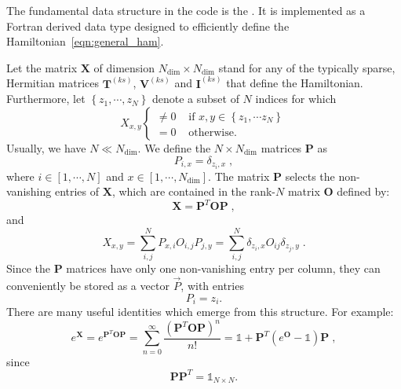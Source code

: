 The fundamental data structure in the code is the . It is implemented as a Fortran derived data type designed to efficiently define the Hamiltonian~\eqref{eqn:general_ham}.

Let the matrix $\bm{X}$ of dimension $N_{\mathrm{dim}} \times N_{\mathrm{dim}}$ stand for any of the typically sparse, Hermitian matrices $\bm{T}^{(ks)}$, $\bm{V}^{(ks)}$ and $\bm{I}^{(ks)}$ that define the Hamiltonian.
Furthermore, let $\left\{z_{1},\cdots, z_{N} \right\}$ denote a subset of $N$ indices
for which
\begin{equation}
X_{x,y} 
\left\{\begin{matrix}  \neq 0  &  \text{ if }   x,  y  \in \left\{ z_1, \cdots z_N \right\}\\ 
                                 = 0         &  \text{ otherwise. } 
      \end{matrix}\right.
\end{equation}
Usually, we have $N\ll N_{\text{dim}}$.
 We define the $N \times N_{\mathrm{dim}}$ matrices $\bm{P}$  as
\begin{equation}
P_{i,x}=\delta_{z_{i},x}\;,
\end{equation}
where $i \in [1,\cdots, N ]$ and $ x  \in [1,\cdots, N_{\mathrm{dim}}]$. The matrix  $\bm{P}$ selects the non-vanishing entries of $\bm{X}$, 
which are contained in the rank-$N$  matrix $\bm{O}$ defined by:
\begin{equation}\label{eqn:xeqpdop}
\bm{X} =\bm{P}^{T} \bm{O} \bm{P}\;,
\end{equation}
and 
\begin{equation}
X_{x,y} = \sum\limits_{i,j}^{N}  P_{x,i}  O_{i,j} P_{j,y}=\sum\limits_{i,j}^{N} \delta_{z_{i},x}  O_{ij} \delta_{z_{j},y} \;.
\end{equation}
Since  the  $\bm{P}$ matrices have only one non-vanishing entry per column,  they can conveniently be stored as a vector $\vec{P}$, with entries
\begin{equation}
     P_i = z_i.
\end{equation}  
There are  many useful  identities which emerge from this  structure. For example: 
\begin{equation}
	e^{\bm{X}} =  e^{\bm{P}^{T} \bm{O} \bm{P}}   = \sum_{n=0}^{\infty}  \frac{\left( \bm{P}^{T} \bm{O} \bm{P} \right)^n}{n!} = \mathds{1}+ \bm{P}^{T} \left(e^{ \bm{O} }-\mathds{1} \right) \bm{P}\;,
\end{equation}
since 
\begin{equation} 
	 \bm{P} \bm{P}^{T}= \mathds{1}_{N\times N}.
\end{equation}


